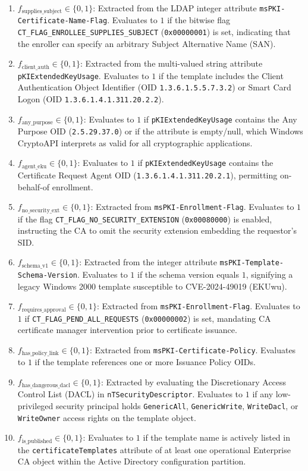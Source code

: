 \begin{enumerate}
    \item $f_{\text{supplies\_subject}} \in \{0, 1\}$: Extracted from the LDAP integer attribute \texttt{msPKI-}\allowbreak\texttt{Certificate-}\allowbreak\texttt{Name-}\allowbreak\texttt{Flag}. Evaluates to $1$ if the bitwise flag \texttt{CT\_FLAG\_ENROLLEE\_SUPPLIES\_SUBJECT} (\texttt{0x00000001}) is set, indicating that the enroller can specify an arbitrary Subject Alternative Name (SAN).
    \item $f_{\text{client\_auth}} \in \{0, 1\}$: Extracted from the multi-valued string attribute \texttt{pKIExtendedKeyUsage}. Evaluates to $1$ if the template includes the Client Authentication Object Identifier (OID \texttt{1.3.6.1.5.5.7.3.2}) or Smart Card Logon (OID \texttt{1.3.6.1.4.1.311.20.2.2}).
    \item $f_{\text{any\_purpose}} \in \{0, 1\}$: Evaluates to $1$ if \texttt{pKIExtendedKeyUsage} contains the Any Purpose OID (\texttt{2.5.29.37.0}) or if the attribute is empty/null, which Windows CryptoAPI interprets as valid for all cryptographic applications.
    \item $f_{\text{agent\_eku}} \in \{0, 1\}$: Evaluates to $1$ if \texttt{pKIExtendedKeyUsage} contains the Certificate Request Agent OID (\texttt{1.3.6.1.4.1.311.20.2.1}), permitting on-behalf-of enrollment.
    \item $f_{\text{no\_security\_ext}} \in \{0, 1\}$: Extracted from \texttt{msPKI-Enrollment-Flag}. Evaluates to $1$ if the flag \texttt{CT\_FLAG\_NO\_SECURITY\_EXTENSION} (\texttt{0x00080000}) is enabled, instructing the CA to omit the security extension embedding the requestor's SID.
    \item $f_{\text{schema\_v1}} \in \{0, 1\}$: Extracted from the integer attribute \texttt{msPKI-Template-Schema-Version}. Evaluates to $1$ if the schema version equals $1$, signifying a legacy Windows 2000 template susceptible to CVE-2024-49019 (EKUwu).
    \item $f_{\text{requires\_approval}} \in \{0, 1\}$: Extracted from \texttt{msPKI-Enrollment-Flag}. Evaluates to $1$ if \texttt{CT\_FLAG\_PEND\_ALL\_REQUESTS} (\texttt{0x00000002}) is set, mandating CA certificate manager intervention prior to certificate issuance.
    \item $f_{\text{has\_policy\_link}} \in \{0, 1\}$: Extracted from \texttt{msPKI-}\allowbreak\texttt{Certificate-}\allowbreak\texttt{Policy}. Evaluates to $1$ if the template references one or more Issuance Policy OIDs.
    \item $f_{\text{has\_dangerous\_dacl}} \in \{0, 1\}$: Extracted by evaluating the Discretionary Access Control List (DACL) in \texttt{nTSecurityDescriptor}. Evaluates to $1$ if any low-privileged security principal holds \texttt{GenericAll}, \texttt{GenericWrite}, \texttt{WriteDacl}, or \texttt{WriteOwner} access rights on the template object.
    \item $f_{\text{is\_published}} \in \{0, 1\}$: Evaluates to $1$ if the template name is actively listed in the \texttt{certificateTemplates} attribute of at least one operational Enterprise CA object within the Active Directory configuration partition.
\end{enumerate}

